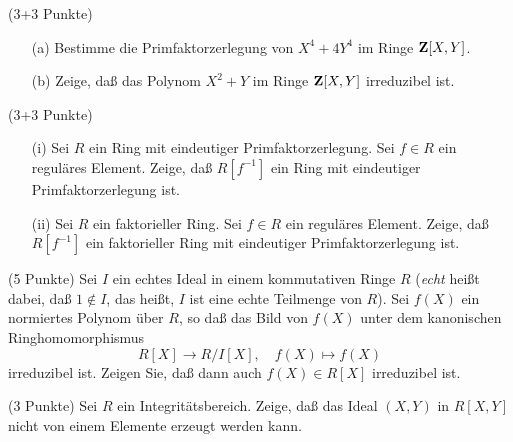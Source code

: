 \documentclass{algsheet}
\author{Dipl.-Math.~Franz Vogler}
\date{27.~Juni 2011}
\begin{document}
                \maketitle


\begin{exercise}(3+3 Punkte)\vspace{-1ex}
  \begin{itemize}
   \item [(a)]     Bestimme die Primfaktorzerlegung von \(X^4 + 4 Y^4\) im Ringe \(\mathbf Z[X, Y]\).

   \item [(b)]      Zeige, daß das Polynom \(X^2 + Y\) im Ringe \(\mathbf Z[X, Y]\) irreduzibel ist.

  \end{itemize}
\end{exercise}



\begin{exercise}(3+3 Punkte)\vspace{-1ex}
  \begin{itemize}
   \item [(i)]      Sei \(R\) ein Ring mit eindeutiger Primfaktorzerlegung. Sei \(f \in R\)
    ein reguläres Element. Zeige, daß \(R[f^{-1}]\) ein Ring mit eindeutiger
    Primfaktorzerlegung ist.
   \item [(ii)]       Sei \(R\) ein faktorieller Ring. Sei \(f \in R\) ein reguläres Element.
    Zeige, daß \(R[f^{-1}]\) ein faktorieller Ring mit eindeutiger Primfaktorzerlegung ist.
  \end{itemize}
\end{exercise}


\begin{exercise}(5 Punkte)\newline
    Sei \(I\) ein echtes Ideal in einem kommutativen Ringe \(R\) (\emph{echt}
    heißt dabei, daß \(1 \notin I\), das heißt, \(I\) ist eine echte Teilmenge
    von \(R\)). Sei \(f(X)\) ein normiertes Polynom über \(R\), so daß das
    Bild von \(f(X)\) unter dem kanonischen Ringhomomorphismus
    \begin{equation}
        R[X] \to R/I[X],\quad f(X) \mapsto f(X)
    \end{equation}
    irreduzibel ist. Zeigen Sie, daß dann auch \(f(X) \in R[X]\) irreduzibel
    ist.
\end{exercise}


\begin{exercise}(3 Punkte)\newline
    Sei \(R\) ein Integritätsbereich. Zeige, daß das Ideal \((X, Y)\) in \(R[X, Y]\)
    nicht von einem Elemente erzeugt werden kann.
\end{exercise}
\end{document}
